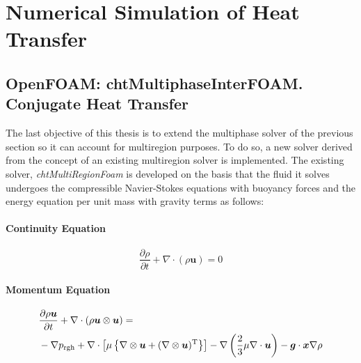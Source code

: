 \chapter{Numerical Simulation of Heat Transfer} %

\label{Chapter4}

\section{OpenFOAM: chtMultiphaseInterFOAM. Conjugate Heat Transfer}
The last objective of this thesis is to extend the multiphase solver of the previous section so it can account for multiregion purposes. To do so, a new solver derived from the concept of an existing multiregion solver is implemented. The existing solver, \textit{chtMultiRegionFoam} is developed on the basis that the fluid it solves undergoes the compressible Navier-Stokes equations with buoyancy forces and the energy equation per unit mass with gravity terms as follows:
\subsubsection*{Continuity Equation}
\begin{equation}
	\frac{\partial \rho}{\partial t}+\nabla \cdot(\rho \boldsymbol{u})=0
	\label{4.1}
\end{equation}
\subsubsection*{Momentum Equation}
\begin{equation}
	\begin{aligned}
		&\frac{\partial \rho \boldsymbol{u}}{\partial t}+\nabla \cdot(\rho \boldsymbol{u} \otimes \boldsymbol{u})=\\
		&-\nabla p_{\mathrm{rgh}}+\nabla \cdot\left[\mu\left\{\nabla \otimes \boldsymbol{u}+(\nabla \otimes \boldsymbol{u})^{\mathrm{T}}\right\}\right]
		-\nabla\left(\frac{2}{3} \mu \nabla \cdot \boldsymbol{u}\right)-\boldsymbol{g} \cdot \boldsymbol{x} \nabla \rho
	\end{aligned}
	\centering
	\label{4.2}
\end{equation}
